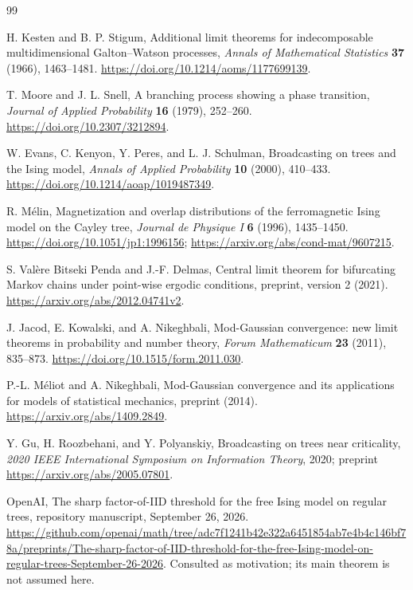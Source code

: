 \documentclass[11pt]{article}
\theoremstyle{definition}
\begin{document}
\begin{thebibliography}{99}

H. Kesten and B. P. Stigum,
Additional limit theorems for indecomposable multidimensional
Galton--Watson processes,
\emph{Annals of Mathematical Statistics} \textbf{37} (1966), 1463--1481.
\url{https://doi.org/10.1214/aoms/1177699139}.

T. Moore and J. L. Snell,
A branching process showing a phase transition,
\emph{Journal of Applied Probability} \textbf{16} (1979), 252--260.
\url{https://doi.org/10.2307/3212894}.

W. Evans, C. Kenyon, Y. Peres, and L. J. Schulman,
Broadcasting on trees and the Ising model,
\emph{Annals of Applied Probability} \textbf{10} (2000), 410--433.
\url{https://doi.org/10.1214/aoap/1019487349}.

R. M\'elin,
Magnetization and overlap distributions of the ferromagnetic Ising model
on the Cayley tree,
\emph{Journal de Physique I} \textbf{6} (1996), 1435--1450.
\url{https://doi.org/10.1051/jp1:1996156};
\url{https://arxiv.org/abs/cond-mat/9607215}.

S. Val\`ere Bitseki Penda and J.-F. Delmas,
Central limit theorem for bifurcating Markov chains under point-wise
ergodic conditions, preprint, version 2 (2021).
\url{https://arxiv.org/abs/2012.04741v2}.

J. Jacod, E. Kowalski, and A. Nikeghbali,
Mod-Gaussian convergence: new limit theorems in probability and number
theory, \emph{Forum Mathematicum} \textbf{23} (2011), 835--873.
\url{https://doi.org/10.1515/form.2011.030}.

P.-L. M\'eliot and A. Nikeghbali,
Mod-Gaussian convergence and its applications for models of statistical
mechanics, preprint (2014).
\url{https://arxiv.org/abs/1409.2849}.

Y. Gu, H. Roozbehani, and Y. Polyanskiy,
Broadcasting on trees near criticality,
\emph{2020 IEEE International Symposium on Information Theory}, 2020;
preprint \url{https://arxiv.org/abs/2005.07801}.

OpenAI,
The sharp factor-of-IID threshold for the free Ising model on regular
trees, repository manuscript, September 26, 2026.
\url{https://github.com/openai/math/tree/adc7f1241b42e322a6451854ab7e4b4c146bf78a/preprints/The-sharp-factor-of-IID-threshold-for-the-free-Ising-model-on-regular-trees-September-26-2026}.
Consulted as motivation; its main theorem is not assumed here.

\end{thebibliography}
\end{document}
